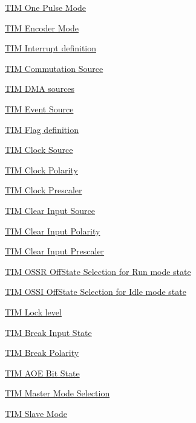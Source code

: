\begin{DoxyCompactItemize}
\hyperlink{group___t_i_m___one___pulse___mode}{T\+I\+M One Pulse Mode}
\item 
\hyperlink{group___t_i_m___encoder___mode}{T\+I\+M Encoder Mode}
\item 
\hyperlink{group___t_i_m___interrupt__definition}{T\+I\+M Interrupt definition}
\item 
\hyperlink{group___t_i_m___commutation___source}{T\+I\+M Commutation Source}
\item 
\hyperlink{group___t_i_m___d_m_a__sources}{T\+I\+M D\+M\+A sources}
\item 
\hyperlink{group___t_i_m___event___source}{T\+I\+M Event Source}
\item 
\hyperlink{group___t_i_m___flag__definition}{T\+I\+M Flag definition}
\item 
\hyperlink{group___t_i_m___clock___source}{T\+I\+M Clock Source}
\item 
\hyperlink{group___t_i_m___clock___polarity}{T\+I\+M Clock Polarity}
\item 
\hyperlink{group___t_i_m___clock___prescaler}{T\+I\+M Clock Prescaler}
\item 
\hyperlink{group___t_i_m___clear_input___source}{T\+I\+M Clear Input Source}
\item 
\hyperlink{group___t_i_m___clear_input___polarity}{T\+I\+M Clear Input Polarity}
\item 
\hyperlink{group___t_i_m___clear_input___prescaler}{T\+I\+M Clear Input Prescaler}
\item 
\hyperlink{group___t_i_m___o_s_s_r___off___state___selection__for___run__mode__state}{T\+I\+M O\+S\+S\+R Off\+State Selection for Run mode state}
\item 
\hyperlink{group___t_i_m___o_s_s_i___off___state___selection__for___idle__mode__state}{T\+I\+M O\+S\+S\+I Off\+State Selection for Idle mode state}
\item 
\hyperlink{group___t_i_m___lock__level}{T\+I\+M Lock level}
\item 
\hyperlink{group___t_i_m___break___input__enable__disable}{T\+I\+M Break Input State}
\item 
\hyperlink{group___t_i_m___break___polarity}{T\+I\+M Break Polarity}
\item 
\hyperlink{group___t_i_m___a_o_e___bit___set___reset}{T\+I\+M A\+O\+E Bit State}
\item 
\hyperlink{group___t_i_m___master___mode___selection}{T\+I\+M Master Mode Selection}
\item 
\hyperlink{group___t_i_m___slave___mode}{T\+I\+M Slave Mode}

\end{DoxyCompactItemize}
